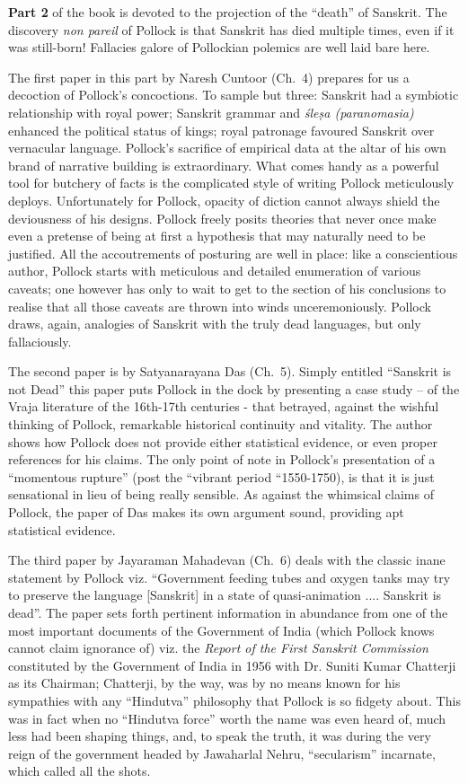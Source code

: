 {\bf Part 2} of the book is devoted to the projection of the “death” of Sanskrit. The discovery {\sl non pareil} of Pollock is that Sanskrit has died multiple times, even if it was still-born! Fallacies galore of Pollockian polemics are well laid bare here.


The first paper in this part by Naresh Cuntoor (Ch.~4) prepares for us a decoction of Pollock’s concoctions. To sample but three: Sanskrit had a symbiotic relationship with royal power; Sanskrit grammar and {\sl śleṣa (paranomasia)} enhanced the political status of kings; royal patronage favoured Sanskrit over vernacular language. Pollock’s sacrifice of empirical data at the altar of his own brand of narrative building is extraordinary. What comes handy as a powerful tool for butchery of facts is the complicated style of writing Pollock meticulously deploys. Unfortunately for Pollock, opacity of diction cannot always shield the deviousness of his designs. Pollock freely posits theories that never once make even a pretense of being at first a hypothesis that may naturally need to be justified. All the accoutrements of posturing are well in place: like a conscientious author, Pollock starts with meticulous and detailed enumeration of various caveats; one however has only to wait to get to the section of his conclusions to realise that all those caveats are thrown into winds unceremoniously. Pollock draws, again, analogies of Sanskrit with the truly dead languages, but only fallaciously.


The second paper is by Satyanarayana Das (Ch.~5). Simply entitled “Sanskrit is not Dead” this paper puts Pollock in the dock by presenting a case study – of the Vraja literature of the 16th-17th centuries - that betrayed, against the wishful thinking of Pollock, remarkable historical continuity and vitality. The author shows how Pollock does not provide either statistical evidence, or even proper references for his claims. The only point of note in Pollock’s presentation of a “momentous rupture” (post the “vibrant period “1550-1750), is that it is just sensational in lieu of being really sensible. As against the whimsical claims of Pollock, the paper of Das makes its own argument sound, providing apt statistical evidence.


The third paper by Jayaraman Mahadevan (Ch.~6) deals with the classic inane statement by Pollock viz. “Government feeding tubes and oxygen tanks may try to preserve the language [Sanskrit] in a state of quasi-animation .... Sanskrit is dead”. The paper sets forth pertinent information in abundance from one of the most important documents of the Government of India (which Pollock knows cannot claim ignorance of) viz. the {\sl Report of the First Sanskrit Commission} constituted by the Government of India in 1956 with Dr. Suniti Kumar Chatterji as its Chairman; Chatterji, by the way, was by no means known for his sympathies with any “Hindutva” philosophy that Pollock is so fidgety about. This was in fact when no “Hindutva force” worth the name was even heard of, much less had been shaping things, and, to speak the truth, it was during the very reign of the government headed by Jawaharlal Nehru, “secularism” incarnate, which called all the shots.


